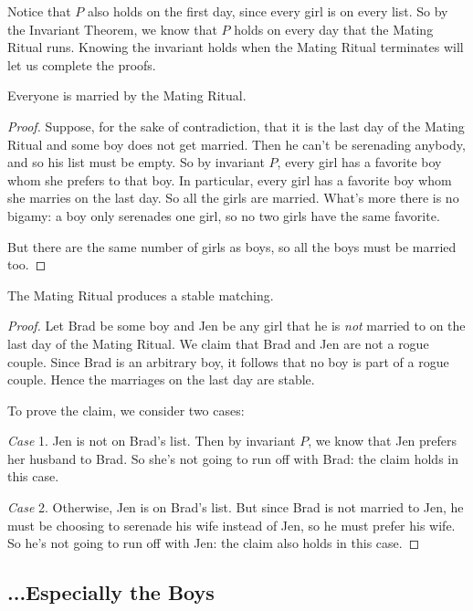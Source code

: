 Notice that $P$ also holds on the first day, since every girl is on every
list.  So by the Invariant Theorem, we know that $P$ holds on every day
that the Mating Ritual runs.  Knowing the invariant holds when the
Mating Ritual terminates will let us complete the proofs.

\begin{theorem}
Everyone is married by the Mating Ritual.
\end{theorem}

\begin{proof}
  Suppose, for the sake of contradiction, that it is the last day of
  the Mating Ritual and some boy does not get married.  Then he can't
  be serenading anybody, and so his list must be empty.  So by invariant
  $P$, every girl has a favorite boy whom she prefers to that boy.  In
  particular, every girl has a favorite boy whom she marries on the
  last day.  So all the girls are married.  What's more there is no
  bigamy: a boy only serenades one girl, so no two girls have the same
  favorite.

But there are the same number of girls as boys, so all the boys must be
married too.
\end{proof}

\begin{theorem}
The Mating Ritual produces a stable matching.
\end{theorem}

\begin{proof}
Let Brad be some boy and Jen be any girl that he is \emph{not} married to
on the last day of the Mating Ritual.  We claim that Brad and Jen are not
a rogue couple.  Since Brad is an arbitrary boy, it follows that no boy is
part of a rogue couple.  Hence the marriages on the last day are stable.

To prove the claim, we consider two cases:

\emph{Case} 1.  Jen is not on Brad's list.  Then by invariant $P$, we know
that Jen prefers her husband to Brad.  So she's not going to run off with
Brad: the claim holds in this case.

\emph{Case} 2.  Otherwise, Jen is on Brad's list.  But since Brad is not
married to Jen, he must be choosing to serenade his wife instead of Jen,
so he must prefer his wife.  So he's not going to run off with Jen: the
claim also holds in this case.
\end{proof}


\subsection{...Especially the Boys}

